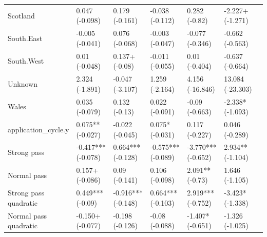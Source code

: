 \begin{longtable}{lllllll}
Scotland & 0.047 
 (-0.098) & 0.179 
 (-0.161) & -0.038 
 (-0.112) & 0.282 
 (-0.82) & -2.227+ 
 (-1.271) \\
South.East & -0.005 
 (-0.041) & 0.076 
 (-0.068) & -0.003 
 (-0.047) & -0.077 
 (-0.346) & -0.662 
 (-0.563) \\
South.West & 0.01 
 (-0.048) & 0.137+ 
 (-0.08) & -0.011 
 (-0.055) & 0.01 
 (-0.404) & -0.637 
 (-0.664) \\
Unknown & 2.324 
 (-1.891) & -0.047 
 (-3.107) & 1.259 
 (-2.164) & 4.156 
 (-16.846) & 13.084 
 (-23.303) \\
Wales & 0.035 
 (-0.079) & 0.132 
 (-0.13) & 0.022 
 (-0.091) & -0.09 
 (-0.663) & -2.338* 
 (-1.093) \\
application\_cycle.y & 0.075** 
 (-0.027) & -0.022 
 (-0.045) & 0.075* 
 (-0.031) & 0.117 
 (-0.227) & 0.046 
 (-0.289) \\
Strong pass & -0.417*** 
 (-0.078) & 0.664*** 
 (-0.128) & -0.575*** 
 (-0.089) & -3.770*** 
 (-0.652) & 2.934** 
 (-1.104) \\
Normal pass & 0.157+ 
 (-0.086) & 0.09 
 (-0.141) & 0.106 
 (-0.098) & 2.091** 
 (-0.73) & 1.646 
 (-1.105) \\
Strong pass quadratic & 0.449*** 
 (-0.09) & -0.916*** 
 (-0.148) & 0.664*** 
 (-0.103) & 2.919*** 
 (-0.752) & -3.423* 
 (-1.338) \\
Normal pass quadratic & -0.150+ 
 (-0.077) & -0.198 
 (-0.126) & -0.08 
 (-0.088) & -1.407* 
 (-0.651) & -1.326 
 (-1.025) \\


\end{longtable}

